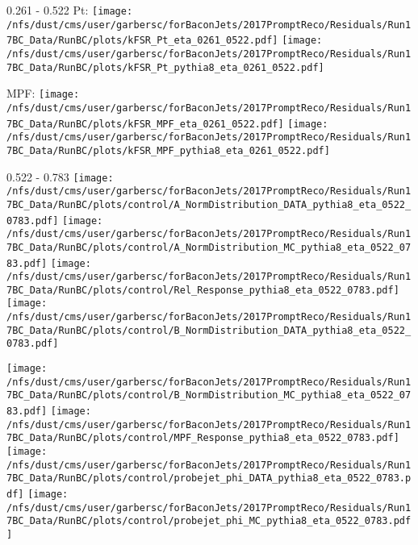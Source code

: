 \documentclass[t,compress]{beamer}
\begin{document}
\begin{frame}{0.261 - 0.522}
	 Pt: \texttt{[image: /nfs/dust/cms/user/garbersc/forBaconJets/2017PromptReco/Residuals/Run17BC\_Data/RunBC/plots/kFSR\_Pt\_eta\_0261\_0522.pdf]}
	\texttt{[image: /nfs/dust/cms/user/garbersc/forBaconJets/2017PromptReco/Residuals/Run17BC\_Data/RunBC/plots/kFSR\_Pt\_pythia8\_eta\_0261\_0522.pdf]}
\newline

	 MPF: \texttt{[image: /nfs/dust/cms/user/garbersc/forBaconJets/2017PromptReco/Residuals/Run17BC\_Data/RunBC/plots/kFSR\_MPF\_eta\_0261\_0522.pdf]}
	\texttt{[image: /nfs/dust/cms/user/garbersc/forBaconJets/2017PromptReco/Residuals/Run17BC\_Data/RunBC/plots/kFSR\_MPF\_pythia8\_eta\_0261\_0522.pdf]}
\end{frame}

\begin{frame}{0.522 - 0.783}
	\texttt{[image: /nfs/dust/cms/user/garbersc/forBaconJets/2017PromptReco/Residuals/Run17BC\_Data/RunBC/plots/control/A\_NormDistribution\_DATA\_pythia8\_eta\_0522\_0783.pdf]}
	\texttt{[image: /nfs/dust/cms/user/garbersc/forBaconJets/2017PromptReco/Residuals/Run17BC\_Data/RunBC/plots/control/A\_NormDistribution\_MC\_pythia8\_eta\_0522\_0783.pdf]}
	\texttt{[image: /nfs/dust/cms/user/garbersc/forBaconJets/2017PromptReco/Residuals/Run17BC\_Data/RunBC/plots/control/Rel\_Response\_pythia8\_eta\_0522\_0783.pdf]}
	\texttt{[image: /nfs/dust/cms/user/garbersc/forBaconJets/2017PromptReco/Residuals/Run17BC\_Data/RunBC/plots/control/B\_NormDistribution\_DATA\_pythia8\_eta\_0522\_0783.pdf]}
\newline

	\texttt{[image: /nfs/dust/cms/user/garbersc/forBaconJets/2017PromptReco/Residuals/Run17BC\_Data/RunBC/plots/control/B\_NormDistribution\_MC\_pythia8\_eta\_0522\_0783.pdf]}
	\texttt{[image: /nfs/dust/cms/user/garbersc/forBaconJets/2017PromptReco/Residuals/Run17BC\_Data/RunBC/plots/control/MPF\_Response\_pythia8\_eta\_0522\_0783.pdf]}
	\texttt{[image: /nfs/dust/cms/user/garbersc/forBaconJets/2017PromptReco/Residuals/Run17BC\_Data/RunBC/plots/control/probejet\_phi\_DATA\_pythia8\_eta\_0522\_0783.pdf]}
	\texttt{[image: /nfs/dust/cms/user/garbersc/forBaconJets/2017PromptReco/Residuals/Run17BC\_Data/RunBC/plots/control/probejet\_phi\_MC\_pythia8\_eta\_0522\_0783.pdf]}
\end{frame}
\end{document}
